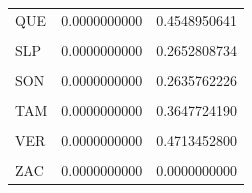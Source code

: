 \documentclass[
]{article}
\begin{document}
\begin{table}[H]
\begin{tabular}[t]{lrr}
QUE & 0.0000000000 & 0.4548950641\\
\cellcolor{gray!6}{ROO} & \cellcolor{gray!6}{0.0245280039} & \cellcolor{gray!6}{0.4869392190}\\
SLP & 0.0000000000 & 0.2652808734\\
\cellcolor{gray!6}{SIN} & \cellcolor{gray!6}{0.0307661982} & \cellcolor{gray!6}{0.5631519968}\\
\addlinespace
SON & 0.0000000000 & 0.2635762226\\
\cellcolor{gray!6}{TAB} & \cellcolor{gray!6}{0.0000000000} & \cellcolor{gray!6}{0.2951929090}\\
TAM & 0.0000000000 & 0.3647724190\\
\cellcolor{gray!6}{TLA} & \cellcolor{gray!6}{0.0000000000} & \cellcolor{gray!6}{0.3676299492}\\
VER & 0.0000000000 & 0.4713452800\\
\addlinespace
\cellcolor{gray!6}{YUC} & \cellcolor{gray!6}{0.0000000000} & \cellcolor{gray!6}{0.3506918412}\\
ZAC & 0.0000000000 & 0.0000000000\\
\bottomrule
\end{tabular}
\end{table}
\end{document}

